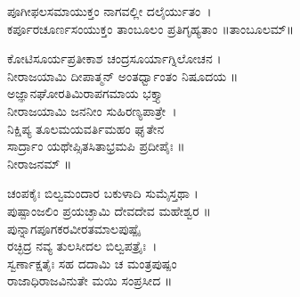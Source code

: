 ಪೂಗೀಫಲಸಮಾಯುಕ್ತಂ ನಾಗವಲ್ಲೀ ದಲೈರ್ಯುತಂ~।\\
ಕರ್ಪೂರಚೂರ್ಣಸಂಯುಕ್ತಂ ತಾಂಬೂಲಂ ಪ್ರತಿಗೃಹ್ಯತಾಂ ॥ತಾಂಬೂಲಮ್॥

ಕೋಟಿಸೂರ್ಯಪ್ರತೀಕಾಶ ಚಂದ್ರಸೂರ್ಯಾಗ್ನಿಲೋಚನ ।\\
ನೀರಾಜಯಾಮಿ ದೀಪಾತ್ಮನ್ ಅಂತರ್ಧ್ವಾಂತಂ ನಿಷೂದಯ ॥ \\
ಅಜ್ಞಾನಘೋರತಿಮಿರಾಪಗಮಾಯ ಭಕ್ತ್ಯಾ \\ನೀರಾಜಯಾಮಿ ಜನನೀಂ ಸುಹಿರಣ್ಯಪಾತ್ರೇ~।\\
ನಿಕ್ಷಿಪ್ಯ ತೂಲಮಯವರ್ತಿಮಹಂ ಘೃತೇನ \\ಸಾರ್ದ್ರಾಂ ಯಥೇಪ್ಸಿತಸಿತಾಭ್ರಮಪಿ ಪ್ರದೀಪೈಃ ॥\\
ನೀರಾಜನಮ್ ॥

ಚಂಪಕೈಃ ಬಿಲ್ವಮಂದಾರ ಬಕುಳಾದಿ ಸುಮೈಸ್ತಥಾ ।\\
ಪುಷ್ಪಾಂಜಲಿಂ ಪ್ರಯಚ್ಛಾಮಿ ದೇವದೇವ ಮಹೇಶ್ವರ ॥\\
ಪುನ್ನಾಗಪೂಗಕರವೀರತಮಾಲಪುಷ್ಪೈ\-\\ರಚ್ಛಿದ್ರ ನವ್ಯ ತುಲಸೀದಲ ಬಿಲ್ವಪತ್ರೈಃ~।\\
ಸ್ವರ್ಣಾಕ್ಷತೈಃ ಸಹ ದದಾಮಿ ಚ ಮಂತ್ರಪುಷ್ಪಂ\\ ರಾಜಾಧಿರಾಜವಿನುತೇ ಮಯಿ ಸಂಪ್ರಸೀದ ॥
